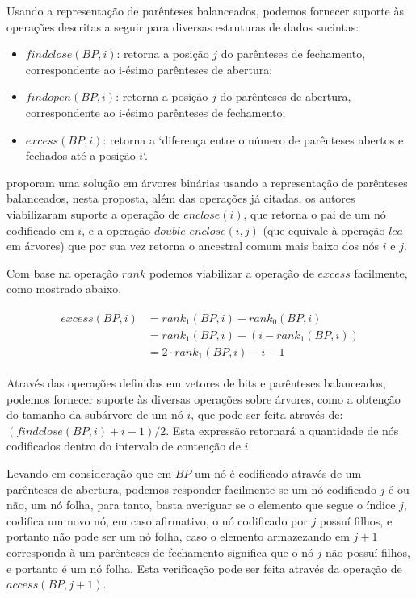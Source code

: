 Usando a representação de parênteses balanceados, podemos fornecer suporte às operações descritas a seguir para diversas estruturas de dados sucintas:
\begin{itemize}
    \item $findclose(BP,i)$: retorna a posição $j$ do parênteses de fechamento, correspondente ao i-ésimo parênteses de abertura;
    \item $findopen(BP, i)$: retorna a posição $j$ do parênteses de abertura, correspondente ao i-ésimo parênteses de fechamento;
    \item $excess(BP, i)$: retorna a `diferença entre o número de parênteses abertos e fechados até a posição $i$`.  \cite[tradução nossa]{paper-succint-representation-of-balanced-parentheses}
\end{itemize}

\citet{paper-succint-representation-of-balanced-parentheses} proporam uma solução em árvores binárias usando a representação de parênteses balanceados, nesta proposta,  além das operações já citadas, os autores viabilizaram suporte a operação de $enclose(i)$, que retorna o pai de um nó codificado em $i$,  e a operação $double\_enclose(i,j)$ (que equivale à operação $lca$ em árvores) que por sua vez retorna o ancestral comum mais baixo dos nós $i$ e $j$. 

Com base na operação  $rank$ podemos viabilizar a operação de $excess$ facilmente, como mostrado abaixo.

\begin{eqnarray*}
    \begin{split}
        excess(BP,i) &= rank_1(BP,i) - rank_0(BP,i) \\
        &  = rank_1(BP,i) - (i - rank_1(BP,i)) \\
        &  = 2 \cdot rank_1(BP,i) - i -1 
    \end{split}
\end{eqnarray*}

Através das operações definidas em vetores de bits e parênteses balanceados, podemos fornecer suporte às diversas operações sobre árvores, como a obtenção do tamanho da subárvore de um nó $i$, que pode ser feita através de: $(findclose(BP,i)+i-1)/2$. Esta expressão retornará a quantidade de nós codificados dentro do intervalo de contenção de $i$. 

Levando em consideração que em $BP$ um nó é codificado através de um parênteses de abertura, podemos responder facilmente se um nó codificado $j$ é ou não, um nó folha, para tanto, basta averiguar se o elemento que segue o índice $j$, codifica um novo nó, em caso afirmativo, o nó codificado por $j$ possuí filhos, e portanto não pode ser um nó folha, caso o elemento armazezando em $j+1$ corresponda à um parênteses de fechamento significa que o nó $j$ não possuí filhos, e portanto é um nó folha. Esta verificação pode ser feita através da operação de $access(BP,j+1)$.

